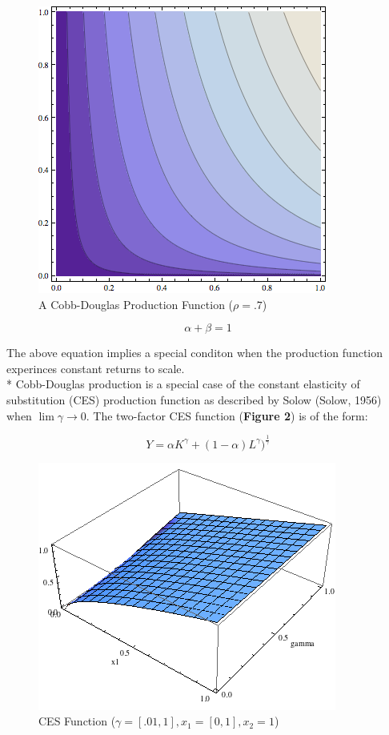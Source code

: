 \documentclass{article}
\begin{document}
\begin{figure}[!ht]
\begin{center}
\includegraphics[scale=.5]{Figures/CobbDouglas}
\caption{A Cobb-Douglas Production Function ($\rho = .7$)}
\end{center}
\end{figure}

\begin{equation}
	\alpha + \beta = 1
\end{equation}

The above equation implies a special conditon when the production function experinces constant returns to scale. \\*
Cobb-Douglas production is a special case of the constant elasticity of substitution (CES) production function as described by Solow (Solow, 1956) when $\lim{\gamma \to 0}$. The two-factor CES function ({\bf Figure 2}) is of the form:

\begin{equation}
	Y = \alpha K^{\gamma} + (1-\alpha) L^{\gamma})^{\frac{1}{\gamma}}
\end{equation}

\begin{figure}[!ht]
	\begin{center}
	\includegraphics[scale=0.5]{Figures/CES.png}
	\caption{CES Function ($\gamma = [.01,1], x_{1} = [0,1], x_{2} = 1 $)}
	\end{center}
\end{figure}
\end{document}
